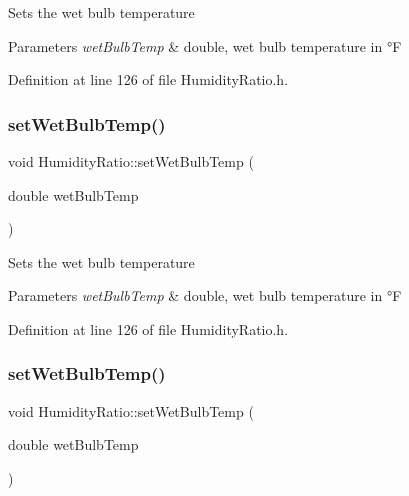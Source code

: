 Sets the wet bulb temperature


\begin{DoxyParams}{Parameters}
{\em wet\+Bulb\+Temp} & double, wet bulb temperature in °F \\
\hline
\end{DoxyParams}


Definition at line 126 of file Humidity\+Ratio.\+h.

\mbox{\label{class_humidity_ratio_a5bda925f783cb4cef848245b00e28e29}} 
\subsubsection{\texorpdfstring{set\+Wet\+Bulb\+Temp()}{setWetBulbTemp()}\hspace{0.1cm}{\footnotesize\ttfamily [2/3]}}
{\footnotesize\ttfamily void Humidity\+Ratio\+::set\+Wet\+Bulb\+Temp (\begin{DoxyParamCaption}\item[{double}]{wet\+Bulb\+Temp }\end{DoxyParamCaption})\hspace{0.3cm}{\ttfamily [inline]}}

Sets the wet bulb temperature


\begin{DoxyParams}{Parameters}
{\em wet\+Bulb\+Temp} & double, wet bulb temperature in °F \\
\hline
\end{DoxyParams}


Definition at line 126 of file Humidity\+Ratio.\+h.

\mbox{\label{class_humidity_ratio_a5bda925f783cb4cef848245b00e28e29}} 
\subsubsection{\texorpdfstring{set\+Wet\+Bulb\+Temp()}{setWetBulbTemp()}\hspace{0.1cm}{\footnotesize\ttfamily [3/3]}}
{\footnotesize\ttfamily void Humidity\+Ratio\+::set\+Wet\+Bulb\+Temp (\begin{DoxyParamCaption}\item[{double}]{wet\+Bulb\+Temp }\end{DoxyParamCaption})\hspace{0.3cm}{\ttfamily [inline]}}

